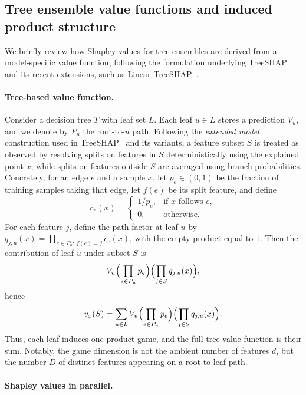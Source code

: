 \documentclass{article}
\begin{document}
\subsection{Tree ensemble value functions and induced product structure}
\label{sec:tree_value_function}

We briefly review how Shapley values for tree ensembles are derived from a
model-specific value function, following the formulation underlying TreeSHAP
and its recent extensions, such as Linear TreeSHAP~\cite{linear_treeshap}.

\paragraph{Tree-based value function.}

Consider a decision tree $T$ with leaf set $L$. Each leaf $u \in L$ stores a prediction $V_u$, and we denote by $P_u$ the root-to-$u$ path. Following the \textit{extended model} construction used in TreeSHAP~\citet{treeshap} and its variants, a feature subset $S$ is treated as observed by resolving splits on features in $S$ deterministically using the explained point $x$, while splits on features outside $S$ are averaged using branch probabilities. Concretely, for an edge $e$ and a sample $x$, let $p_e \in (0,1)$ be the fraction of training samples taking that edge, let $f(e)$ be its split feature, and define
\[
c_e(x)=
\begin{cases}
1/p_e, & \text{if } x \text{ follows } e,\\
0, & \text{otherwise.}
\end{cases}
\]
For each feature $j$, define the path factor at leaf $u$ by $q_{j,u}(x)=\prod_{e\in P_u:\, f(e)=j} c_e(x)$,
with the empty product equal to $1$. Then the contribution of leaf $u$ under subset $S$ is
\[
V_u \Bigl(\prod_{e\in P_u} p_e\Bigr)\Bigl(\prod_{j\in S} q_{j,u}(x)\Bigr),
\]
hence
\[
v_x(S)=\sum_{u\in L} V_u \Bigl(\prod_{e\in P_u} p_e\Bigr)\Bigl(\prod_{j\in S} q_{j,u}(x)\Bigr).
\]
Thus, each leaf induces one product game, and the full tree value function is their sum. Notably, the game dimension is not the ambient number of features $d$, but the number $D$ of distinct features appearing on a root-to-leaf path.

\paragraph{Shapley values in parallel.}
\end{document}
